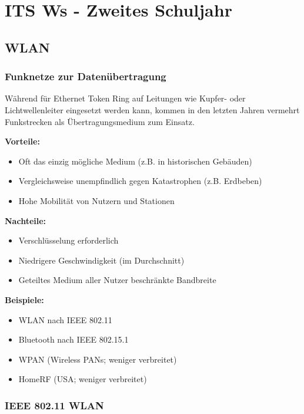 \documentclass[asp1.tex]{subfiles}
\begin{document}
\section{ITS Ws - Zweites Schuljahr}



\subsection{WLAN}
\subsubsection{Funknetze zur Datenübertragung}

Während für Ethernet Token Ring auf Leitungen wie Kupfer- oder Lichtwellenleiter eingesetzt werden kann, kommen in den letzten Jahren vermehrt Funkstrecken als Übertragungsmedium zum Einsatz.

\textbf{Vorteile:}
\begin{itemize}
    \item Oft das einzig mögliche Medium (z.B. in historischen Gebäuden)
    \item Vergleichsweise unempfindlich gegen Katastrophen (z.B. Erdbeben)
    \item Hohe Mobilität von Nutzern und Stationen
\end{itemize}

\textbf{Nachteile:}
\begin{itemize}
    \item Verschlüsselung erforderlich
    \item Niedrigere Geschwindigkeit (im Durchschnitt)
    \item Geteiltes Medium aller Nutzer \textrightarrow\space beschränkte Bandbreite
\end{itemize}

\textbf{Beispiele:}
\begin{itemize}
    \item WLAN nach IEEE 802.11
    \item Bluetooth nach IEEE 802.15.1
    \item WPAN (Wireless PANs; weniger verbreitet)
    \item HomeRF (USA; weniger verbreitet)
\end{itemize}

\subsubsection{IEEE 802.11 WLAN}
\end{document}

